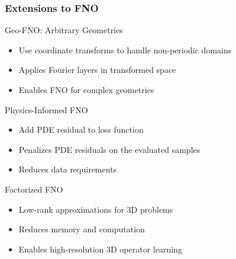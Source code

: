 \documentclass{beamer}
\begin{document}
\begin{frame}
\frametitle{Extensions to FNO}

\begin{block}{Geo-FNO: Arbitrary Geometries}
\begin{itemize}
    \item Use coordinate transforms to handle non-periodic domains
    \item Applies Fourier layers in transformed space
    \item Enables FNO for complex geometries
\end{itemize}
\end{block}

\begin{block}{Physics-Informed FNO}
\begin{itemize}
    \item Add PDE residual to loss function
    \item Penalizes PDE residuals on the evaluated samples
    \item Reduces data requirements
\end{itemize}
\end{block}

\begin{block}{Factorized FNO}
\begin{itemize}
    \item Low-rank approximations for 3D problems
    \item Reduces memory and computation
    \item Enables high-resolution 3D operator learning
\end{itemize}
\end{block}

\end{frame}
\end{document}
